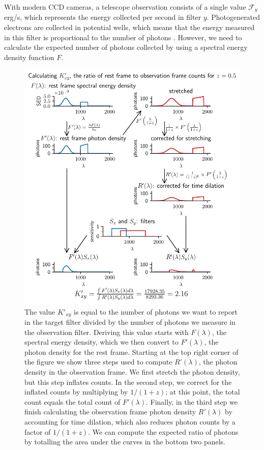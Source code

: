 \documentclass[aps,prl,reprint,amsmath]{revtex4-2}
\begin{document}
With modern CCD cameras, a telescope observation consists of a single value
$\mathcal{F}_y$ erg/s, which represents the energy collected per second in
filter $y$. Photogenerated electrons are collected in potential wells, which
means that the energy measured in this filter is proportional to the number of
photons \citep{lesser2015}. However, we need to calculate the expected number
of photons collected by using a spectral energy density function $F$.

\begin{figure}
  \includegraphics[width=\columnwidth]{k_equation_flow.pdf}
  \caption{The value $K'_{xy}$ is equal to the number of photons we want to
  report in the target filter divided by the number of photons we measure in
  the observation filter. Deriving this value starts with $F(\lambda)$, the
  spectral energy density, which we then convert to $F'(\lambda)$, the photon
  density for the rest frame. Starting at the top right corner of the figure we
  show three steps used to compute $R'(\lambda)$, the photon density in the
  observation frame. We first stretch the photon density, but this step
  inflates counts. In the second step, we correct for the inflated counts by
  multiplying by $1/(1+z)$; at this point, the total count equals the total
  count of $F'(\lambda)$. Finally, in the third step we finish calculating the
  observation frame photon density $R'(\lambda)$ by accounting for time
  dilation, which also reduces photon counts by a factor of $1/(1+z)$. We can
  compute the expected ratio of photons by totalling the area under the curves
  in the bottom two panels.
  }
  \label{fig:k-example}
\end{figure}
\end{document}
